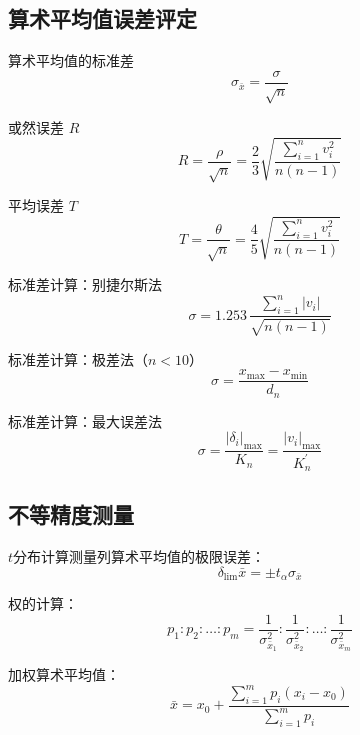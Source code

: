 \documentclass[12pt,a4paper]{ctexart}
\begin{document}
\subsection{算术平均值误差评定}

算术平均值的标准差
\begin{equation*}
\sigma_{\bar{x}}=\frac{\sigma}{\sqrt{n}}
\end{equation*}

或然误差 $R$
\begin{equation*}
R=\frac{\rho}{\sqrt{n}}=\frac{2}{3}\sqrt{\frac{\sum_{i=1}^{n}v_i^2}{n(n-1)}}
\end{equation*}

平均误差 $T$
\begin{equation*}
T=\frac{\theta}{\sqrt{n}}=\frac{4}{5}\sqrt{\frac{\sum_{i=1}^{n}v_i^2}{n(n-1)}}
\end{equation*}

标准差计算：别捷尔斯法
\begin{equation*}
\sigma=1.253\,\frac{\sum_{i=1}^{n}\lvert v_i\rvert}{\sqrt{n(n-1)}}
\end{equation*}

标准差计算：极差法（$n<10$）
\begin{equation*}
\sigma=\frac{x_{\max}-x_{\min}}{d_n}
\end{equation*}

标准差计算：最大误差法
\begin{equation*}
\sigma=\dfrac{{\lvert \delta_i\rvert}_{\max}}{K_n}=\frac{{\lvert v_i\rvert}_{\max}}{K_n^{\prime}}
\end{equation*}

\subsection{不等精度测量}

$t$分布计算测量列算术平均值的极限误差：
\begin{equation*}
\delta_{\lim}\bar{x}=\pm t_{\alpha} \sigma_{\bar{x}}
\end{equation*}

权的计算：
\begin{equation*}
p_1:p_2:\ldots:p_m=\frac{1}{\sigma_{\bar{x}_1}^2}:\frac{1}{\sigma_{\bar{x}_2}^2}:\ldots:\frac{1}{\sigma_{\bar{x}_m}^2}
\end{equation*}

加权算术平均值：
\begin{equation*}
    \bar{x}=x_0+\frac{\displaystyle\sum_{i=1}^{m}p_i(x_i-x_0)}
    {\displaystyle\sum_{i=1}^{m}p_i}
\end{equation*}
\end{document}
